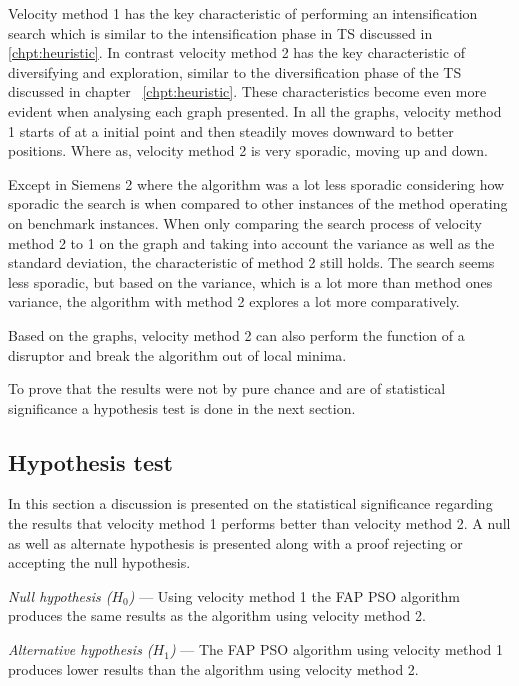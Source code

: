 Velocity method 1 has the key characteristic of performing an intensification search which is similar to the intensification phase in \gls{TS} discussed in \ref{chpt:heuristic}. In contrast velocity method 2 has the key characteristic of diversifying and exploration, similar to the diversification phase of the \gls{TS} discussed in chapter ~\ref{chpt:heuristic}. These characteristics become even more evident when analysing each graph presented. In all the graphs, velocity method 1 starts of at a initial point and then steadily moves downward to better positions. Where as, velocity method 2 is very sporadic, moving up and down. 

Except in Siemens 2 where the algorithm was a lot less sporadic considering how sporadic the search is when compared to other instances of the method operating on benchmark instances. When only comparing the search process of velocity method 2 to 1 on the graph and taking into account the variance as well as the standard deviation, the characteristic of method 2 still holds. The search seems less sporadic, but based on the variance, which is a lot more than method ones variance, the algorithm with method 2 explores a lot more comparatively.

Based on the graphs, velocity method 2 can also perform the function of a disruptor and break the algorithm out of local minima.

To prove that the results were not by pure chance and are of statistical significance a hypothesis test is done in the next section.
\subsection{Hypothesis test}
In this section a discussion is presented on the statistical significance regarding the results that velocity method 1 performs better than velocity method 2. A null as well as alternate hypothesis is presented along with a proof rejecting or accepting the null hypothesis.

\begin{description}
    \item{\emph{Null hypothesis ($H_0$)}} --- Using velocity method 1 the FAP PSO algorithm produces the same results as the algorithm using velocity method 2.

    \item{\emph{Alternative hypothesis ($H_1$)}} --- The FAP PSO algorithm using velocity method 1 produces lower results than the algorithm using velocity method 2.
\end{description}

